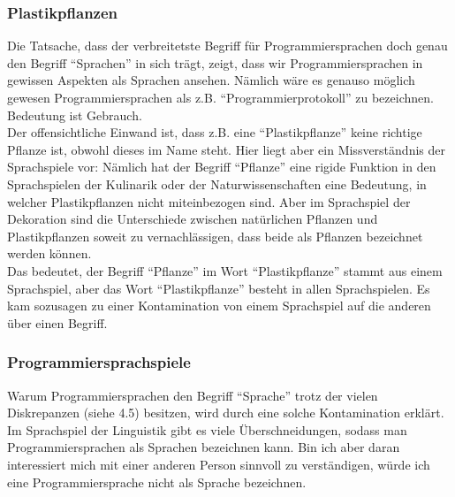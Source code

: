 \documentclass[10pt,a4paper]{article}
\begin{document}
\subsubsection{Plastikpflanzen}
Die Tatsache, dass der verbreitetste Begriff für Programmiersprachen doch genau den Begriff \enquote{Sprachen} in sich trägt, zeigt, dass wir Programmiersprachen in gewissen Aspekten als Sprachen ansehen. Nämlich wäre es genauso möglich gewesen Programmiersprachen als z.B. \enquote{Programmierprotokoll} zu bezeichnen. Bedeutung ist Gebrauch. \\
Der offensichtliche Einwand ist, dass z.B. eine \enquote{Plastikpflanze} keine richtige Pflanze ist, obwohl dieses im Name steht. Hier liegt aber ein Missverständnis der Sprachspiele vor: Nämlich hat der Begriff \enquote{Pflanze} eine rigide Funktion in den Sprachspielen der Kulinarik oder der Naturwissenschaften eine Bedeutung, in welcher Plastikpflanzen nicht miteinbezogen sind. Aber im Sprachspiel der Dekoration sind die Unterschiede zwischen natürlichen Pflanzen und Plastikpflanzen soweit zu vernachlässigen, dass beide als Pflanzen bezeichnet werden können. \\
Das bedeutet, der Begriff \enquote{Pflanze} im Wort \enquote{Plastikpflanze} stammt aus einem Sprachspiel, aber das Wort \enquote{Plastikpflanze} besteht in allen Sprachspielen. Es kam sozusagen zu einer Kontamination von einem Sprachspiel auf die anderen über einen Begriff.

\subsubsection{Programmiersprachspiele}
Warum Programmiersprachen den Begriff \enquote{Sprache} trotz der vielen Diskrepanzen (siehe 4.5) besitzen, wird durch eine solche Kontamination erklärt. Im Sprachspiel der Linguistik gibt es viele Überschneidungen, sodass man Programmiersprachen als Sprachen bezeichnen kann. Bin ich aber daran interessiert mich mit einer anderen Person sinnvoll zu verständigen, würde ich eine Programmiersprache nicht als Sprache bezeichnen.
\end{document}

